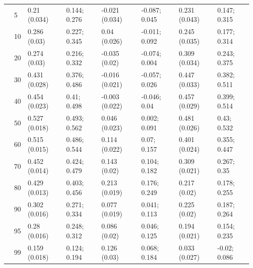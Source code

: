 \begin{landscape}
\begin{table}
{\begin{tabular}[t]{llllllll}
 & 5 & 0.21 (0.034) & 0.144; 0.276 & -0.021 (0.034) & -0.087; 0.045 & 0.231 (0.043) & 0.147; 0.315\\
 & 10 & 0.286 (0.03) & 0.227; 0.345 & 0.04 (0.026) & -0.011; 0.092 & 0.245 (0.035) & 0.177; 0.314\\
 & 20 & 0.274 (0.03) & 0.216; 0.332 & -0.035 (0.02) & -0.074; 0.004 & 0.309 (0.034) & 0.243; 0.375\\
 & 30 & 0.431 (0.028) & 0.376; 0.486 & -0.016 (0.021) & -0.057; 0.026 & 0.447 (0.033) & 0.382; 0.511\\
 & 40 & 0.454 (0.023) & 0.41; 0.498 & -0.003 (0.022) & -0.046; 0.04 & 0.457 (0.029) & 0.399; 0.514\\
 & 50 & 0.527 (0.018) & 0.493; 0.562 & 0.046 (0.023) & 0.002; 0.091 & 0.481 (0.026) & 0.43; 0.532\\
 & 60 & 0.515 (0.015) & 0.486; 0.544 & 0.114 (0.022) & 0.07; 0.157 & 0.401 (0.024) & 0.355; 0.447\\
 & 70 & 0.452 (0.014) & 0.424; 0.479 & 0.143 (0.02) & 0.104; 0.182 & 0.309 (0.021) & 0.267; 0.35\\
 & 80 & 0.429 (0.013) & 0.403; 0.456 & 0.213 (0.019) & 0.176; 0.249 & 0.217 (0.02) & 0.178; 0.255\\
 & 90 & 0.302 (0.016) & 0.271; 0.334 & 0.077 (0.019) & 0.041; 0.113 & 0.225 (0.02) & 0.187; 0.264\\
 & 95 & 0.28 (0.016) & 0.248; 0.312 & 0.086 (0.02) & 0.046; 0.125 & 0.194 (0.021) & 0.154; 0.235\\
 & 99 & 0.159 (0.018) & 0.124; 0.194 & 0.126 (0.03) & 0.068; 0.184 & 0.033 (0.027) & -0.02; 0.086\\
\bottomrule
\end{tabular}}
\end{table}
\end{landscape}
